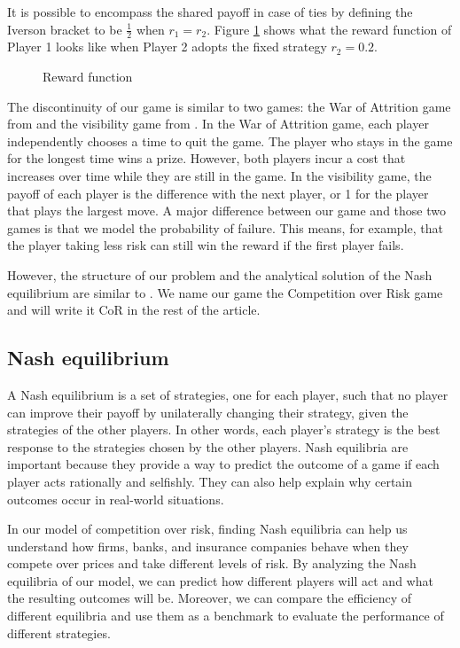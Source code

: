 \documentclass[preprint,12pt,authoryear,doubleblind]{elsarticle}
\theoremstyle{definition}
\begin{document}
It is possible to encompass the shared payoff in case of ties by defining the Iverson bracket to be $\frac{1}{2}$ when $r_1 = r_2$.
Figure \ref{fig:reward} shows what the reward function of Player 1 looks like when Player 2 adopts the fixed strategy $r_2=0.2$.

\begin{figure}[htbp]
    \centering
    
    \caption{Reward function}
    \label{fig:reward}
\end{figure}


The discontinuity of our game is similar to two games: the War of Attrition game from \cite{smith1974theory} and the visibility game from \cite{Lotker2008-tx}. In the War of Attrition game, each player independently chooses a time to quit the game. The player who stays in the game for the longest time wins a prize. However, both players incur a cost that increases over time while they are still in the game. In the visibility game, the payoff of each player is the difference with the next player, or 1 for the player that plays the largest move. A major difference between our game and those two games is that we model the probability of failure. This means, for example, that the player taking less risk can still win the reward if the first player fails.

However, the structure of our problem and the analytical solution of the Nash equilibrium are similar to \cite{Lotker2008-tx}. We name our game the Competition over Risk game and will write it CoR in the rest of the article.

\subsection{Nash equilibrium}

A Nash equilibrium is a set of strategies, one for each player, such that no player can improve their payoff by unilaterally changing their strategy, given the strategies of the other players. In other words, each player's strategy is the best response to the strategies chosen by the other players. Nash equilibria are important because they provide a way to predict the outcome of a game if each player acts rationally and selfishly. They can also help explain why certain outcomes occur in real-world situations.

In our model of competition over risk, finding Nash equilibria can help us understand how firms, banks, and insurance companies behave when they compete over prices and take different levels of risk. By analyzing the Nash equilibria of our model, we can predict how different players will act and what the resulting outcomes will be. Moreover, we can compare the efficiency of different equilibria and use them as a benchmark to evaluate the performance of different strategies.
\end{document}
